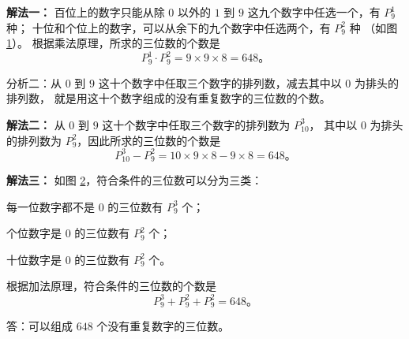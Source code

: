 \textbf{解法一：} 百位上的数字只能从除 $0$ 以外的 $1$ 到 $9$ 这九个数字中任选一个，有 $P_9^1$ 种；
十位和个位上的数字，可以从余下的九个数字中任选两个，有 $P_9^2$ 种 （如图\ref{fig:2-5}）。
根据乘法原理，所求的三位数的个数是
$$ P_9^1 \cdot P_9^2 = 9 \times 9 \times 8 = 648 \text{。} $$

\begin{figure}[htbp]
    \centering
    
    \caption{}\label{fig:2-5}
\end{figure}

分析二：从 $0$ 到 $9$ 这十个数字中任取三个数字的排列数，减去其中以 $0$ 为排头的排列数，
就是用这十个数字组成的没有重复数字的三位数的个数。

\textbf{解法二：} 从 $0$ 到 $9$ 这十个数字中任取三个数字的排列数为 $P_{10}^3$，
其中以 $0$ 为排头的排列数为 $P_9^2$，因此所求的三位数的个数是
$$ P_{10}^3 - P_9^2 = 10 \times 9 \times 8 - 9 \times 8 = 648 \text{。} $$

\textbf{解法三：} 如图 \ref{fig:2-6}，符合条件的三位数可以分为三类：

每一位数字都不是 0 的三位数有 $P_9^3$ 个；

个位数字是 $0$ 的三位数有 $P_9^2$ 个；

十位数字是 $0$ 的三位数有 $P_9^2$ 个。

\begin{figure}[htbp]
    \centering
    
    \caption{}\label{fig:2-6}
\end{figure}

根据加法原理，符合条件的三位数的个数是
$$ P_9^3 + P_9^2 + P_9^2 = 648 \text{。} $$

答：可以组成 $648$ 个没有重复数字的三位数。



